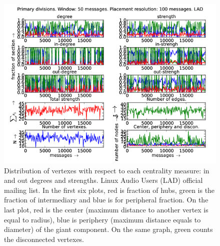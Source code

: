 \documentclass[%
 aip,
 jmp,%
 amsmath,amssymb,
 reprint,%
]{revtex4-1}
\begin{document}
\begin{figure}[hbtp] 
   \centering
        \includegraphics[width=\textwidth]{figs/LAD/50}
    \caption{Distribution of vertexes with respect to each centrality measure: in and out degrees and strengths. Linux Audio Users (LAD) official mailing list. In the first six plots, red is fraction of hubs, green is the fraction of intermediary and blue is for peripheral fraction. On the last plot, red is the center (maximum distance to another vertex is equal to radius), blue is periphery (maximum distance equals to diameter) of the giant component. On the same graph, green counts the disconnected vertexes.}
    \label{fig:lad50}
\end{figure}
\end{document}
